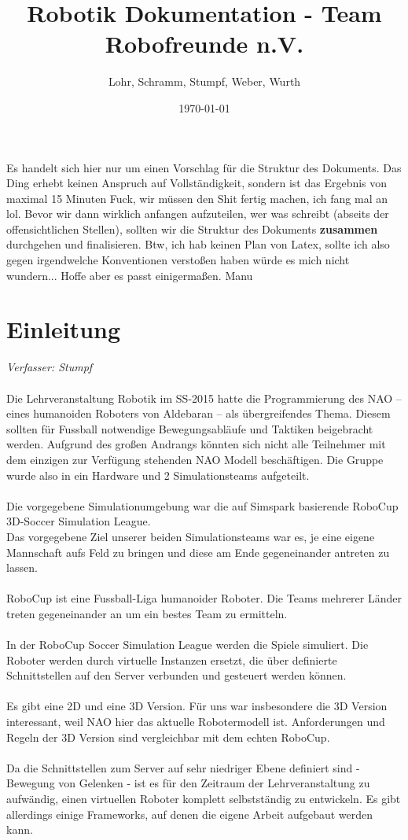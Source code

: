 \documentclass[fontsize=12pt,a4paper,final]{scrartcl}[2003/01/01]
\title{Robotik Dokumentation - Team Robofreunde n.V.}
\author{Lohr, Schramm, Stumpf, Weber, Wurth}
\date{\today}
\begin{document}
Es handelt sich hier nur um einen Vorschlag für die Struktur des Dokuments. Das Ding erhebt keinen Anspruch auf Vollständigkeit, sondern ist das Ergebnis von maximal 15 Minuten \glqq Fuck, wir müssen den Shit fertig machen, ich fang mal an lol\grqq. Bevor wir dann wirklich anfangen aufzuteilen, wer was schreibt (abseits der offensichtlichen Stellen), sollten wir die Struktur des Dokuments \textbf{zusammen} durchgehen und finalisieren. Btw, ich hab keinen Plan von Latex, sollte ich also gegen irgendwelche Konventionen verstoßen haben würde es mich nicht wundern... Hoffe aber es passt einigermaßen. Manu


\maketitle
\tableofcontents

\section{Einleitung}\label{se:Einleitung}
\textit{Verfasser: Stumpf}\\
\\
Die Lehrveranstaltung Robotik im SS-2015 hatte die Programmierung des NAO -- eines humanoiden Roboters von Aldebaran -- als übergreifendes Thema. Diesem sollten für Fussball notwendige Bewegungsabläufe und Taktiken beigebracht werden. Aufgrund des großen Andrangs könnten sich nicht alle Teilnehmer mit dem einzigen zur Verfügung stehenden NAO Modell beschäftigen. Die Gruppe wurde also in ein Hardware und 2 Simulationsteams aufgeteilt.\\
\\
Die vorgegebene Simulationumgebung war die auf Simspark basierende RoboCup 3D-Soccer Simulation League.\\
Das vorgegebene Ziel unserer beiden Simulationsteams war es, je eine eigene Mannschaft aufs Feld zu bringen und diese am Ende gegeneinander antreten zu lassen.\\
\\
RoboCup ist eine Fussball-Liga humanoider Roboter. Die Teams mehrerer Länder treten gegeneinander an um ein bestes Team zu ermitteln.\\
\\
In der RoboCup Soccer Simulation League werden die Spiele simuliert. Die Roboter werden durch virtuelle Instanzen ersetzt, die über definierte Schnittstellen auf den Server verbunden und gesteuert werden können.\\
\\
Es gibt eine 2D und eine 3D Version. Für uns war insbesondere die 3D Version interessant, weil NAO hier das aktuelle Robotermodell ist. Anforderungen und Regeln der 3D Version sind vergleichbar mit dem echten RoboCup.\\
\\
Da die Schnittstellen zum Server auf sehr niedriger Ebene definiert sind - Bewegung von Gelenken - ist es für den Zeitraum der Lehrveranstaltung zu aufwändig, einen virtuellen Roboter komplett selbstständig zu entwickeln. Es gibt allerdings einige Frameworks, auf denen die eigene Arbeit aufgebaut werden kann.
\end{document}
